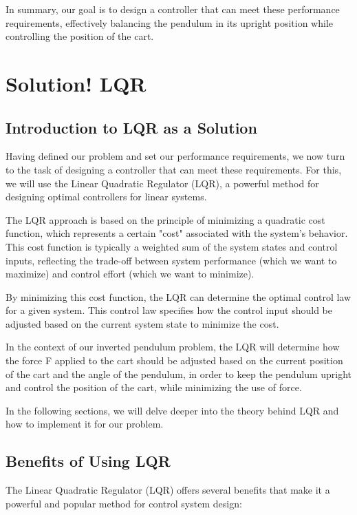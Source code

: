 \documentclass[11pt,twocolumn,twoside,lineno]{pnas-new}
\begin{document}
In summary, our goal is to design a controller that can meet these performance requirements, effectively balancing the pendulum in its upright position while controlling the position of the cart.


\section{Solution! LQR}
\subsection{Introduction to LQR as a Solution}
Having defined our problem and set our performance requirements, we now turn to the task of designing a controller that can meet these requirements. For this, we will use the Linear Quadratic Regulator (LQR), a powerful method for designing optimal controllers for linear systems.

The LQR approach is based on the principle of minimizing a quadratic cost function, which represents a certain "cost" associated with the system's behavior. This cost function is typically a weighted sum of the system states and control inputs, reflecting the trade-off between system performance (which we want to maximize) and control effort (which we want to minimize).

By minimizing this cost function, the LQR can determine the optimal control law for a given system. This control law specifies how the control input should be adjusted based on the current system state to minimize the cost.

In the context of our inverted pendulum problem, the LQR will determine how the force F applied to the cart should be adjusted based on the current position of the cart and the angle of the pendulum, in order to keep the pendulum upright and control the position of the cart, while minimizing the use of force.

In the following sections, we will delve deeper into the theory behind LQR and how to implement it for our problem.

\subsection{Benefits of Using LQR}
The Linear Quadratic Regulator (LQR) offers several benefits that make it a powerful and popular method for control system design:
\end{document}
